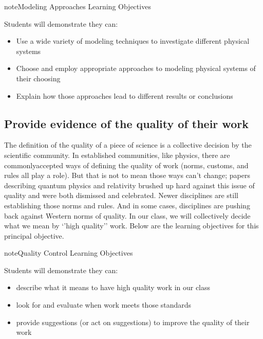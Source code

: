 \documentclass[letterpaper,10pt,english]{jupyterBook}
\begin{document}
\begin{sphinxadmonition}{note}{Modeling Approaches Learning Objectives}

\sphinxAtStartPar
Students will demonstrate they can:
\begin{itemize}
\item {} 
\sphinxAtStartPar
Use a wide variety of modeling techniques to investigate different physical systems

\item {} 
\sphinxAtStartPar
Choose and employ appropriate approaches to modeling physical systems of their choosing

\item {} 
\sphinxAtStartPar
Explain how those approaches lead to different results or conclusions

\end{itemize}
\end{sphinxadmonition}


\subsection{Provide evidence of the quality of their work}
\label{\detokenize{content/0_course/goals:provide-evidence-of-the-quality-of-their-work}}
\sphinxAtStartPar
The definition of the quality of a piece of science is a collective decision by the scientific community. In established communities, like physics, there are commonly\sphinxhyphen{}accepted ways of defining the quality of work (norms, customs, and rules all play a role). But that is not to mean those ways can’t change; papers describing quantum physics and relativity brushed up hard against this issue of quality and were both dismissed and celebrated. Newer disciplines are still establishing those norms and rules. And in some cases, disciplines are pushing back against Western norms of quality. In our class, we will collectively decide what we mean by ‘’high quality’’ work. Below are the learning objectives for this principal objective.

\begin{sphinxadmonition}{note}{Quality Control Learning Objectives}

\sphinxAtStartPar
Students will demonstrate they can:
\begin{itemize}
\item {} 
\sphinxAtStartPar
describe what it means to have high quality work in our class

\item {} 
\sphinxAtStartPar
look for and evaluate when work meets those standards

\item {} 
\sphinxAtStartPar
provide suggestions (or act on suggestions) to improve the quality of their work

\end{itemize}
\end{sphinxadmonition}
\end{document}
